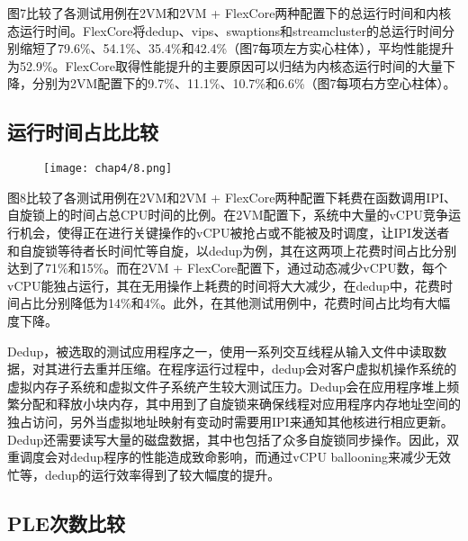 图7比较了各测试用例在2VM和2VM + FlexCore两种配置下的总运行时间和内核态运行时间。FlexCore将dedup、vips、swaptions和streamcluster的总运行时间分别缩短了79.6\%、54.1\%、35.4\%和42.4\%（图7每项左方实心柱体），平均性能提升为52.9\%。FlexCore取得性能提升的主要原因可以归结为内核态运行时间的大量下降，分别为2VM配置下的9.7\%、11.1\%、10.7\%和6.6\%（图7每项右方空心柱体）。

\subsection{运行时间占比比较}

\begin{figure}[!htp]
  \centering
  \texttt{[image: chap4/8.png]}
\end{figure}

图8比较了各测试用例在2VM和2VM + FlexCore两种配置下耗费在函数调用IPI、自旋锁上的时间占总CPU时间的比例。在2VM配置下，系统中大量的vCPU竞争运行机会，使得正在进行关键操作的vCPU被抢占或不能被及时调度，让IPI发送者和自旋锁等待者长时间忙等自旋，以dedup为例，其在这两项上花费时间占比分别达到了71\%和15\%。而在2VM + FlexCore配置下，通过动态减少vCPU数，每个vCPU能独占运行，其在无用操作上耗费的时间将大大减少，在dedup中，花费时间占比分别降低为14\%和4\%。此外，在其他测试用例中，花费时间占比均有大幅度下降。

Dedup，被选取的测试应用程序之一，使用一系列交互线程从输入文件中读取数据，对其进行去重并压缩。在程序运行过程中，dedup会对客户虚拟机操作系统的虚拟内存子系统和虚拟文件子系统产生较大测试压力。Dedup会在应用程序堆上频繁分配和释放小块内存，其中用到了自旋锁来确保线程对应用程序内存地址空间的独占访问，另外当虚拟地址映射有变动时需要用IPI来通知其他核进行相应更新。Dedup还需要读写大量的磁盘数据，其中也包括了众多自旋锁同步操作。因此，双重调度会对dedup程序的性能造成致命影响，而通过vCPU ballooning来减少无效忙等，dedup的运行效率得到了较大幅度的提升。



\subsection{PLE次数比较}

